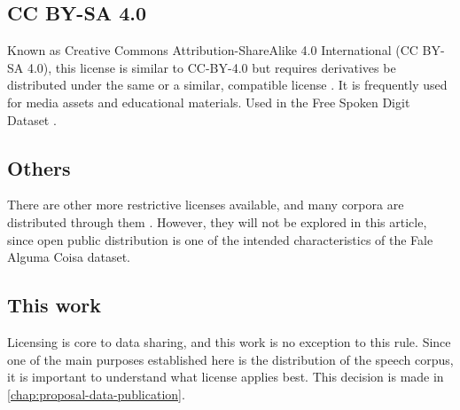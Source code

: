 \subsection{CC BY-SA 4.0}

Known as Creative Commons Attribution-ShareAlike 4.0 International (CC BY-SA 4.0), this license is similar to CC-BY-4.0 but requires derivatives be distributed under the same or a similar, compatible license \cite{licenses-ccby-sa40}. It is frequently used for media assets and educational materials. Used in the Free Spoken Digit Dataset \cite{dataset-free-spoken-digit}.

\subsection{Others}

There are other more restrictive licenses available, and many corpora are distributed through them \cite{Lamel1992timmit}. However, they will not be explored in this article, since open public distribution is one of the intended characteristics of the Fale Alguma Coisa dataset.

\subsection{This work}

Licensing is core to data sharing, and this work is no exception to this rule. Since one of the main purposes established here is the distribution of the speech corpus, it is important to understand what license applies best. This decision is made in \ref{chap:proposal-data-publication}.